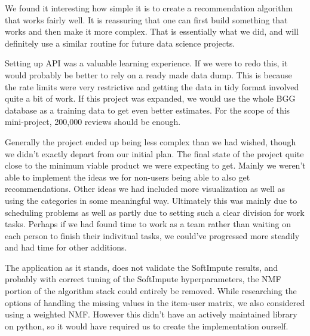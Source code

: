 \documentclass[a4paper,12pt,bibliography=totoc,numbers=noenddot,sfdefaults=false,abstract=true,notitlepage]{scrartcl} %
\begin{document}
	We found it interesting how simple it is to create a recommendation algorithm that works fairly well. It is reassuring that one can first build something that works and then make it more complex. That is essentially what we did, and will definitely use a similar routine for future data science projects.
	
	
	Setting up API was a valuable learning experience. If we were to redo this, it would probably be better to rely on a ready made data dump. This is because the rate limits were very restrictive and getting the data in tidy format involved quite a bit of work. If this project was expanded, we would use the whole BGG database as a training data to get even better estimates. For the scope of this mini-project, 200,000 reviews should be enough.

	
	
	Generally the project ended up being less complex than we had wished, though we didn't exactly depart from our initial plan. The final state of the project quite close to the minimum viable product we were expecting to get. Mainly we weren't able to implement the ideas we for non-users being able to also get recommendations. Other ideas we had included more visualization as well as using the categories in some meaningful way. Ultimately this was mainly due to scheduling problems as well as partly due to setting such a clear division for work tasks. Perhaps if we had found time to work as a team rather than waiting on each person to finish their indivitual tasks, we could've progressed more steadily and had time for other additions.


    The application as it stands, does not validate the SoftImpute results, and probably with correct tuning of the SoftImpute hyperparameters, the NMF portion of
    the algorithm stack could entirely be removed. While researching the options of handling the missing values in the item-user matrix, we also considered using a weighted
    NMF. However this didn't have an actively maintained library on python, so it would have required us to create the implementation ourself.
    
\end{document}
